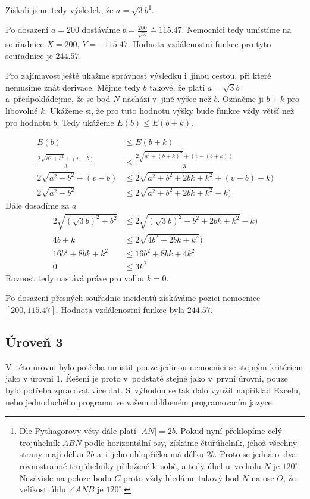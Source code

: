 \documentclass[12pt,a4paper]{article}
\begin{document}
Získali jsme tedy výsledek, že $a = \sqrt{3}b$\footnote{Dle Pythagorovy věty dále platí
$|AN|=2b$. Pokud nyní překlopíme celý trojúhelník $ABN$ podle horizontální osy,
získáme čtuřúhelník, jehož všechny strany mají délku $2b$ a~i~jeho uhlopříčka má délku $2b$. Proto se jedná o~dva rovnostranné trojúhelníky přiložené k~sobě, a tedy úhel u~vrcholu $N$ je $120^\circ$.
Nezávisle na poloze bodu $C$ proto vždy hledáme takový bod $N$ na ose $O$, že velikost úhlu $\angle ANB$ je $120^\circ$.}.

Po dosazení $a = 200$ dostáváme $b = \frac{200}{\sqrt{3}}
\doteq 115.47$. Nemocnici tedy umístíme na souřadnice $X = 200$, $Y = -115.47$.
Hodnota vzdálenostní funkce pro tyto souřadnice je $244.57$.

Pro zajímavost ještě ukažme správnost výsledku i~jinou cestou, při které nemusíme znát derivace. Mějme tedy $b$ takové, že platí $a = \sqrt{3}b$ a~předpokládejme, že se bod $N$ nachází v~jiné výšce než $b$.
Označme ji $b+k$ pro libovolné $k$. Ukážeme si, že pro tuto hodnotu výšky bude funkce vždy větší než pro hodnotu $b$. Tedy ukážeme $E(b) \leq E(b+k)$.

\begin{align}
	E(b) &\leq E(b+k) \nonumber \\
	\frac{2 \sqrt{a^2+b^2} + (v - b)}{3} &\leq \frac{2 \sqrt{a^2+(b+k)^2} + (v - (b+k))}{3} \nonumber \\
	2 \sqrt{a^2+b^2} + (v - b) &\leq 2 \sqrt{a^2+b^2+2bk+k^2} + (v - b) - k) \nonumber \\
	2 \sqrt{a^2+b^2} &\leq 2 \sqrt{a^2+b^2+2bk+k^2} - k) \nonumber
\end{align}
	Dále dosadíme za $a$
\begin{align}
	2 \sqrt{(\sqrt{3}b)^2+b^2} &\leq 2 \sqrt{(\sqrt{3}b)^2+b^2+2bk+k^2} - k) \nonumber \\
	4b + k &\leq 2 \sqrt{4b^2+2bk+k^2}) \nonumber \\
	16b^2 + 8bk + k^2 &\leq 16b^2+8bk+4k^2 \nonumber \\
	0 &\leq 3k^2 \nonumber
\end{align}
Rovnost tedy nastává práve pro volbu $k=0$.

Po dosazení přesných souřadnic incidentů získáváme pozici nemocnice $[200, 115.47]$. Hodnota vzdálenostní funkce byla $244.57$.

\subsection*{Úroveň 3}
V~této úrovni bylo potřeba umístit pouze jedinou nemocnici se stejným kritériem
jako v úrovni 1. Řešení je proto v~podstatě stejné jako v~první úrovni, pouze
bylo potřeba zpracovat více dat. S~výhodou se tak dalo využít například Excelu,
nebo jednoduchého programu ve vašem oblíbeném programovacím jazyce.
\end{document}
